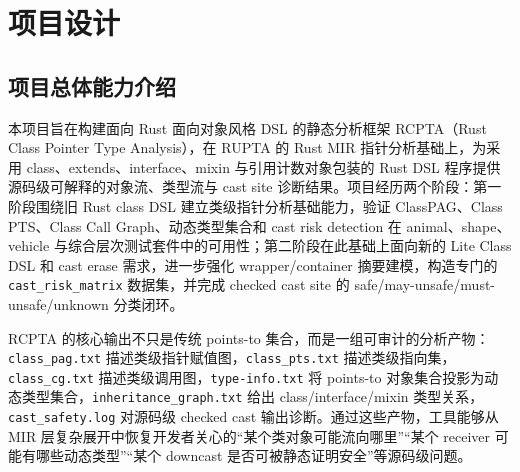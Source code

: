\documentclass[10.5pt,compsoc,UTF8]{cjc}
\theoremstyle{mystyle}
\begin{document}


\vskip 10mm
\newpage
{}
\renewcommand{\contentsname}{\heiti 目录}
\tableofcontents
\newpage

\newcommand{\zcy}[1]{\textcolor{red}{ZCY:#1}}





\newpage
\doublespacing
\thispagestyle{empty}

{\raggedright
{}
\section{\heiti\centering 项目设计}}

\subsection{项目总体能力介绍}

本项目旨在构建面向 Rust 面向对象风格 DSL 的静态分析框架 RCPTA（Rust Class Pointer Type Analysis），在 RUPTA 的 Rust MIR 指针分析基础上，为采用 class、extends、interface、mixin 与引用计数对象包装的 Rust DSL 程序提供源码级可解释的对象流、类型流与 cast site 诊断结果。项目经历两个阶段：第一阶段围绕旧 Rust class DSL 建立类级指针分析基础能力，验证 ClassPAG、Class PTS、Class Call Graph、动态类型集合和 cast risk detection 在 animal、shape、vehicle 与综合层次测试套件中的可用性；第二阶段在此基础上面向新的 Lite Class DSL 和 cast erase 需求，进一步强化 wrapper/container 摘要建模，构造专门的 \texttt{cast\_risk\_matrix} 数据集，并完成 checked cast site 的 safe/may-unsafe/must-unsafe/unknown 分类闭环。

RCPTA 的核心输出不只是传统 points-to 集合，而是一组可审计的分析产物：\texttt{class\_pag.txt} 描述类级指针赋值图，\texttt{class\_pts.txt} 描述类级指向集，\texttt{class\_cg.txt} 描述类级调用图，\texttt{type-info.txt} 将 points-to 对象集合投影为动态类型集合，\texttt{inheritance\_graph.txt} 给出 class/interface/mixin 类型关系，\texttt{cast\_safety.log} 对源码级 checked cast 输出诊断。通过这些产物，工具能够从 MIR 层复杂展开中恢复开发者关心的“某个类对象可能流向哪里”“某个 receiver 可能有哪些动态类型”“某个 downcast 是否可被静态证明安全”等源码级问题。
\end{document}
